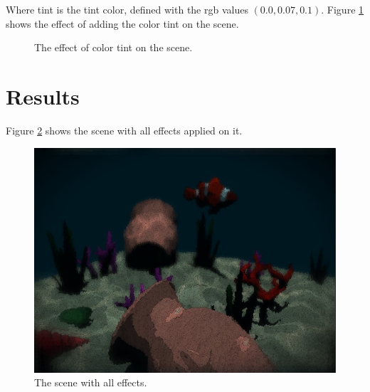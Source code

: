 \documentclass{article}
\begin{document}
\medskip \par
\noindent
Where tint is the tint color, defined with the rgb values $(0.0, 0.07, 0.1)$.
Figure \ref{fig:scene_with_tint} shows the effect of adding the color tint on the scene.

\begin{figure}[h]
	\centering
	\hspace{0.5em}
	\caption{The effect of color tint on the scene.}
	\label{fig:scene_with_tint}
\end{figure}


\section{Results}
Figure \ref{fig:result} shows the scene with all effects applied on it.
\begin{figure}[h]
	\centering
	\includegraphics[width=\linewidth]{imgs/all_scene.jpg}
	\caption{The scene with all effects.}
	\label{fig:result}
\end{figure}
\end{document}
